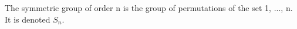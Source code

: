 The symmetric group of order n is the group of permutations of the
set {1, ..., n}. It is denoted $S_{n}.$ 